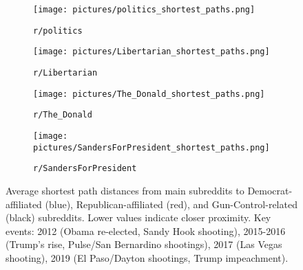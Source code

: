 \documentclass{article}
\theoremstyle{definition}
\begin{document}
\begin{figure}[H]
    \centering
    \begin{subfigure}[b]{0.48\textwidth}
        \texttt{[image: pictures/politics\_shortest\_paths.png]}
        \caption{\texttt{r/politics}}
        \label{fig:politics_paths}
    \end{subfigure}
    \hfill
    \begin{subfigure}[b]{0.48\textwidth}
        \texttt{[image: pictures/Libertarian\_shortest\_paths.png]}
        \caption{\texttt{r/Libertarian}}
        \label{fig:libertarian_paths}
    \end{subfigure}
    
    \vspace{1em} %
    
    \begin{subfigure}[b]{0.48\textwidth}
        \texttt{[image: pictures/The\_Donald\_shortest\_paths.png]}
        \caption{\texttt{r/The\_Donald}}
        \label{fig:thedonald_paths}
    \end{subfigure}
    \hfill
    \begin{subfigure}[b]{0.48\textwidth}
        \texttt{[image: pictures/SandersForPresident\_shortest\_paths.png]}
        \caption{\texttt{r/SandersForPresident}}
        \label{fig:sanders_paths}
    \end{subfigure}
    \caption{Average shortest path distances from main subreddits to Democrat-affiliated (blue), Republican-affiliated (red), and Gun-Control-related (black) subreddits. Lower values indicate closer proximity. Key events: 2012 (Obama re-elected, Sandy Hook shooting), 2015-2016 (Trump's rise, Pulse/San Bernardino shootings), 2017 (Las Vegas shooting), 2019 (El Paso/Dayton shootings, Trump impeachment).}
    \label{fig:shortest_paths_all}
\end{figure}
\end{document}
